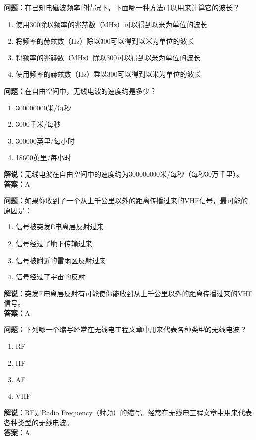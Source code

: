\documentclass{ctexbook}%
\begin{document}
\textbf{问题：}在已知电磁波频率的情况下，下面哪一种方法可以用来计算它的波长？
\begin{enumerate}[label=\Alph*), leftmargin=3em]
\item 使用300除以频率的兆赫数（MHz）可以得到以米为单位的波长
\item 将频率的赫兹数（Hz）除以300可以得到以米为单位的波长
\item 将频率的兆赫数（MHz）除以300可以得到以米为单位的波长
\item 使用频率的赫兹数（Hz）乘以300可以得到以米为单位的波长
\end{enumerate}

\textbf{问题：}在自由空间中，无线电波的速度约是多少？
\begin{enumerate}[label=\Alph*), leftmargin=3em]
\item 300000000米/每秒
\item 3000千米/每秒
\item 300000英里/每小时
\item 18600英里/每小时
\end{enumerate}
\textbf{解说：}无线电波在自由空间中的速度约为300000000米/每秒（每秒30万千里）。\\
\textbf{答案：}A

\textbf{问题：}如果你收到了一个从上千公里以外的距离传播过来的VHF信号，最可能的原因是：
\begin{enumerate}[label=\Alph*), leftmargin=3em]
\item 信号被突发E电离层反射过来
\item 信号经过了地下传输过来
\item 信号被附近的雷雨区反射过来
\item 信号经过了宇宙的反射
\end{enumerate}
\textbf{解说：}突发E电离层反射有可能使你能收到从上千公里以外的距离传播过来的VHF信号。\\
\textbf{答案：}A

\textbf{问题：}下列哪一个缩写经常在无线电工程文章中用来代表各种类型的无线电波？
\begin{enumerate}[label=\Alph*), leftmargin=3em]
\item RF
\item HF
\item AF
\item VHF
\end{enumerate}
\textbf{解说：}RF是Radio Frequency（射频）的缩写。经常在无线电工程文章中用来代表各种类型的无线电波。\\
\textbf{答案：}A
\end{document}
